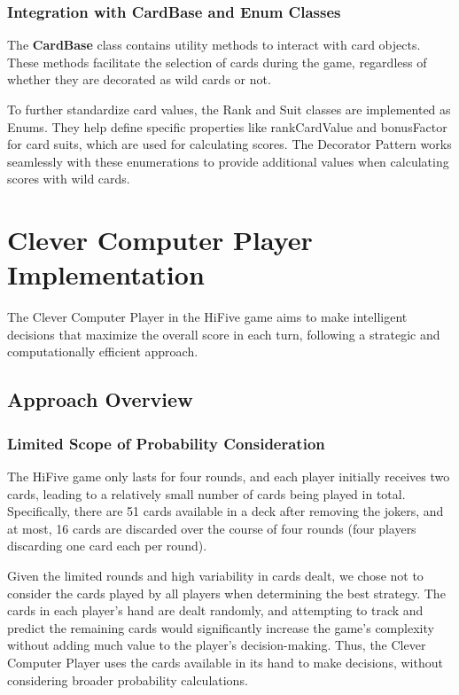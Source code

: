 \documentclass[a4paper, 12pt]{report}
\begin{document}
    \subsection{Integration with CardBase and Enum Classes}

    The \textbf{CardBase} class contains utility methods to interact with card objects. These methods facilitate the selection of cards during the game, regardless of whether they are decorated as wild cards or not.

    To further standardize card values, the Rank and Suit classes are implemented as Enums. They help define specific properties like rankCardValue and bonusFactor for card suits, which are used for calculating scores. The Decorator Pattern works seamlessly with these enumerations to provide additional values when calculating scores with wild cards.
    
    \newpage

    \chapter{Clever Computer Player Implementation}

    The Clever Computer Player in the HiFive game aims to make intelligent decisions that maximize the overall score in each turn, following a strategic and computationally efficient approach.

    \section{Approach Overview}
    
    \subsection{Limited Scope of Probability Consideration}
    
    The HiFive game only lasts for four rounds, and each player initially receives two cards, leading to a relatively small number of cards being played in total. Specifically, there are 51 cards available in a deck after removing the jokers, and at most, 16 cards are discarded over the course of four rounds (four players discarding one card each per round).

    Given the limited rounds and high variability in cards dealt, we chose not to consider the cards played by all players when determining the best strategy. The cards in each player's hand are dealt randomly, and attempting to track and predict the remaining cards would significantly increase the game's complexity without adding much value to the player's decision-making. Thus, the Clever Computer Player uses the cards available in its hand to make decisions, without considering broader probability calculations.
\end{document}
